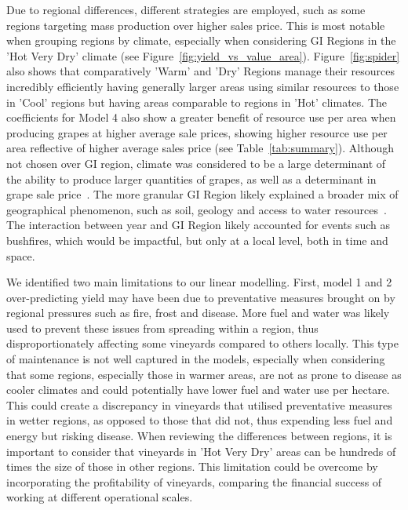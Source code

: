 \documentclass[10pt,letterpaper]{article}
\begin{document}
\par
Due to regional differences, different strategies are  employed, such as some regions targeting mass production over higher sales price. This is most notable when grouping regions by climate, especially when considering GI Regions in the 'Hot Very Dry' climate (see Figure~\ref{fig:yield_vs_value_area}). Figure~\ref{fig:spider} also shows that comparatively 'Warm' and 'Dry' Regions manage their resources incredibly efficiently having generally larger areas using similar resources to those in 'Cool' regions but having areas comparable to regions in 'Hot' climates. The coefficients for Model 4 also show a greater benefit of resource use per area when producing grapes at higher average sale prices, showing higher resource use per area reflective of higher average sales price (see Table~\ref{tab:summary}).
Although not chosen over GI region, climate was considered to be a large determinant of the ability to produce larger quantities of grapes, as well as a determinant in grape sale price~\cite{agostaRegionalClimateVariability2012}. The more granular GI Region likely explained a broader mix of geographical phenomenon, such as soil, geology and access to water resources~\cite{abbalDecisionSupportSystem2016,carmonaUseParticipatoryObjectOriented2011}. The interaction between year and GI Region likely accounted for events such as bushfires, which would be impactful, but only at a local level, both in time and space.
\par
We identified two main limitations to our linear modelling. First, model 1 and 2 over-predicting yield may have been due to preventative measures brought on by regional pressures such as fire, frost and disease. More fuel and water was likely used to prevent these issues from spreading within a region, thus disproportionately affecting some vineyards compared to others locally. This type of maintenance is not well captured in the models, especially when considering that some regions, especially those in warmer areas, are not as prone to disease as cooler climates and could potentially have lower fuel and water use per hectare. This could create a discrepancy in vineyards that utilised preventative measures in wetter regions, as opposed to those that did not, thus expending less fuel and energy but risking disease. When reviewing the differences between regions, it is important to consider that vineyards in 'Hot Very Dry' areas can be hundreds of times the size of those in other regions. This limitation could be overcome by incorporating the profitability of vineyards, comparing the financial success of working at different operational scales.
\end{document}
